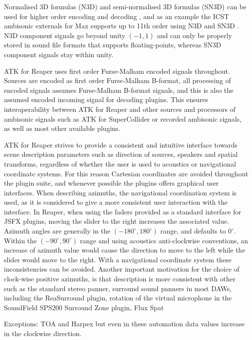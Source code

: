 \documentclass{article}
\begin{document}
Normalised 3D formulas (N3D) and semi-normalised 3D formulas (SN3D) can be used for higher order encoding and decoding  \cite{daniel:2001phd}, and as an example the ICST ambisonic externals for Max supports up to 11th order using N3D and SN3D \cite{schacher2010:seven}.
N3D component signals go beyond unity $(-1, 1)$ and can only be properly stored in sound file formats that supports floating-points, whereas SN3D component signals stay within unity. 

ATK for Reaper uses first order Furse-Malham encoded signals throughout.
Sources are encoded as first order Furse-Malham B-format, all processing of encoded signals assumes Furse-Malham B-format signals, and this is also the assumed encoded incoming signal for decoding plugins.
This ensures interoperability between ATK for Reaper and other sources and processors of ambisonic signals such as ATK for SuperCollider or recorded ambisonic signals, as well as most other available plugins.

ATK for Reaper strives to provide a consistent and intuitive interface towards scene description parameters such as direction of sources, speakers and spatial transforms, regardless of whether the user is used to acoustics or navigational coordinate systems.
For this reason Cartesian coordinates are avoided throughout the plugin suite, and whenever possible the plugins offers graphical user interfaces.
When describing azimuths, the navigational coordination system is used, as it is considered to give a more consistent user interaction with the interface.
In Reaper, when using the faders provided as a standard interface for JSFX plugins, moving the slider to the right increases the associated value.
Azimuth angles are generally in the $(-180^{\circ}, 180^{\circ})$ range, and defaults to $0^{\circ}$. 
Within the $(-90^{\circ}, 90^{\circ})$ range and using acoustics anti-clockwise conventions, an increase of azimuth value would cause the direction to move to the left while the slider would move to the right.
With a navigational coordinate system these inconsistencies can be avoided.
Another important motivation for the choice of clock-wise positive azimuths, is that description is more consistent with other 
such as the standard stereo panner, surround sound panners in most DAWs, including the ReaSurround plugin, 
rotation of the virtual microphone in the SoundField SPS200 Surround Zone plugin, 
Flux Spat

Exceptions: TOA and Harpex
but even in these automation data values increase in the clockwise direction.
\end{document}
